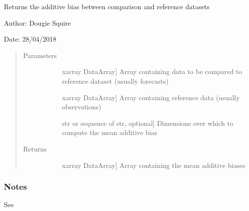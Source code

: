 \documentclass[letterpaper,10pt,english]{sphinxmanual}
\begin{document}

\begin{fulllineitems}
\label{\detokenize{skill_doc:skill.mean_additive_bias}}
Returns the additive bias between comparison and reference datasets

\begin{DUlineblock}{0em}
\item[] Author: Dougie Squire
\item[] Date: 28/04/2018
\end{DUlineblock}
\begin{quote}\begin{description}
\item[{Parameters}] \leavevmode\begin{description}
\item[{}] \leavevmode{[}xarray DataArray{]}
Array containing data to be compared to reference dataset (usually forecasts)

\item[{}] \leavevmode{[}xarray DataArray{]}
Array containing reference data (usually observations)

\item[{}] \leavevmode{[}str or sequence of str, optional{]}
Dimensions over which to compute the mean additive bias

\end{description}

\item[{Returns}] \leavevmode\begin{description}
\item[{}] \leavevmode{[}xarray DataArray{]}
Array containing the mean additive biases

\end{description}

\end{description}\end{quote}
\subsubsection*{Notes}

See 

\end{fulllineitems}
\end{document}
